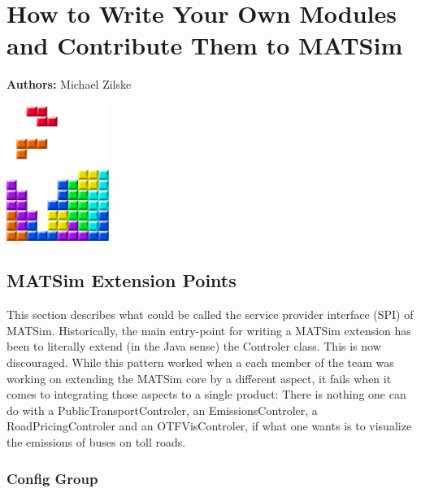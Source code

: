 \chapter{How to Write Your Own Modules and Contribute Them to MATSim }
\label{ch:extensionpoints}
\hfill \textbf{Authors:} Michael Zilske

\begin{center} \includegraphics[width=0.25\textwidth, angle=0]{figures/MATSimBook.png} \end{center}



\section{MATSim Extension Points}
This section describes what could be called the service provider interface (SPI) of MATSim.
Historically, the main entry-point for writing a MATSim extension has been to literally extend (in the Java sense)
the Controler class. This is now discouraged. While this pattern worked when a each member of the team
was working on extending the MATSim core by a different aspect, it fails when it comes to
integrating those aspects to a single product: There is nothing one can do with a PublicTransportControler, an EmissionsControler, a RoadPricingControler and an OTFVisControler,
if what one wants is to visualize the emissions of buses on toll roads.

\subsection{Config Group}
\label{sec:config}

